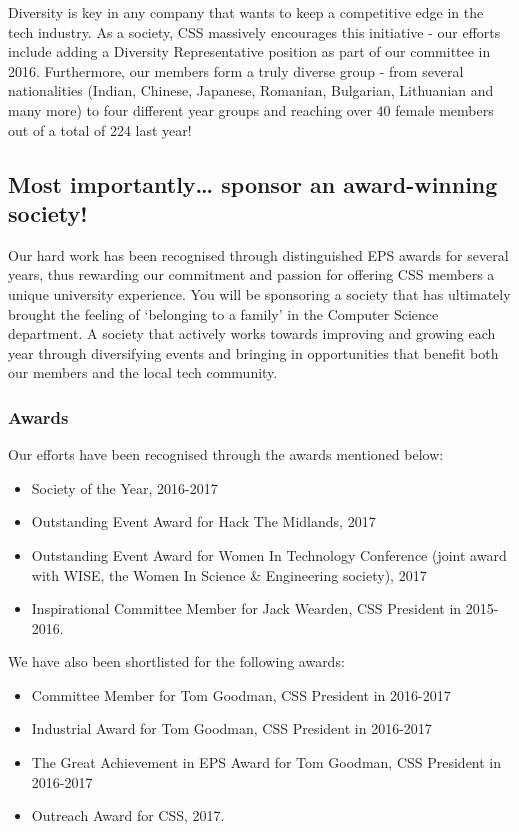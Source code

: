 \documentclass{article}
\begin{document}
Diversity is key in any company that wants to keep a competitive edge in the tech industry. As a society, CSS massively encourages this initiative - our efforts include adding a Diversity Representative position as part of our committee in 2016. 
Furthermore, our members form a truly diverse group - from several nationalities (Indian, Chinese, Japanese, Romanian, Bulgarian, Lithuanian and many more) to four different year groups and reaching over 40 female members out of a total of 224 last year! 

\subsection*{Most importantly… sponsor an award-winning society!}

Our hard work has been recognised through distinguished EPS awards for several years, thus rewarding our commitment and passion for offering CSS members a unique university experience. 
You will be sponsoring a society that has ultimately brought the feeling of ‘belonging to a family’ in the Computer Science department.
A society that actively works towards improving and growing each year through diversifying events and bringing in opportunities that benefit both our members and the local tech community.

\subsubsection*{Awards}

\noindent Our efforts have been recognised through the awards mentioned below:

\begin{itemize}
  \item Society of the Year, 2016-2017
  \item Outstanding Event Award for Hack The Midlands, 2017
  \item Outstanding Event Award for Women In Technology Conference (joint award with WISE, the Women In Science \& Engineering society), 2017
  \item Inspirational Committee Member for Jack Wearden, CSS President in 2015-2016.
\end{itemize}

\medskip

\noindent We have also been shortlisted for the following awards:
\begin{itemize}
  \item Committee Member for Tom Goodman, CSS President in 2016-2017
  \item Industrial Award for Tom Goodman, CSS President in 2016-2017
  \item The Great Achievement in EPS Award for Tom Goodman, CSS President in 2016-2017
  \item Outreach Award for CSS, 2017.
\end{itemize}
\end{document}
